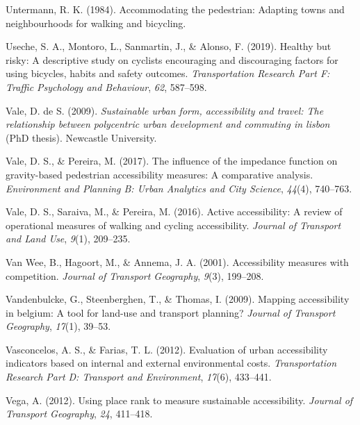 \documentclass[12pt,twoside]{reedthesis}
\newlength{\cslhangindent}
\newenvironment{CSLReferences}[2] %
 {%
  \setlength{\parindent}{0pt}
  \ifodd #1 \everypar{\setlength{\hangindent}{\cslhangindent}}\ignorespaces\fi
  \ifnum #2 > 0
  \setlength{\parskip}{#2\baselineskip}
  \fi
 }%
 {}
\begin{document}
\begin{CSLReferences}{1}{0}
\leavevmode{}%
Untermann, R. K. (1984). Accommodating the pedestrian: Adapting towns and neighbourhoods for walking and bicycling.

\leavevmode{}%
Useche, S. A., Montoro, L., Sanmartin, J., \& Alonso, F. (2019). Healthy but risky: A descriptive study on cyclists encouraging and discouraging factors for using bicycles, habits and safety outcomes. \emph{Transportation Research Part F: Traffic Psychology and Behaviour}, \emph{62}, 587--598.

\leavevmode{}%
Vale, D. de S. (2009). \emph{Sustainable urban form, accessibility and travel: The relationship between polycentric urban development and commuting in lisbon} (PhD thesis). Newcastle University.

\leavevmode{}%
Vale, D. S., \& Pereira, M. (2017). The influence of the impedance function on gravity-based pedestrian accessibility measures: A comparative analysis. \emph{Environment and Planning B: Urban Analytics and City Science}, \emph{44}(4), 740--763.

\leavevmode{}%
Vale, D. S., Saraiva, M., \& Pereira, M. (2016). Active accessibility: A review of operational measures of walking and cycling accessibility. \emph{Journal of Transport and Land Use}, \emph{9}(1), 209--235.

\leavevmode{}%
Van Wee, B., Hagoort, M., \& Annema, J. A. (2001). Accessibility measures with competition. \emph{Journal of Transport Geography}, \emph{9}(3), 199--208.

\leavevmode{}%
Vandenbulcke, G., Steenberghen, T., \& Thomas, I. (2009). Mapping accessibility in belgium: A tool for land-use and transport planning? \emph{Journal of Transport Geography}, \emph{17}(1), 39--53.

\leavevmode{}%
Vasconcelos, A. S., \& Farias, T. L. (2012). Evaluation of urban accessibility indicators based on internal and external environmental costs. \emph{Transportation Research Part D: Transport and Environment}, \emph{17}(6), 433--441.

\leavevmode{}%
Vega, A. (2012). Using place rank to measure sustainable accessibility. \emph{Journal of Transport Geography}, \emph{24}, 411--418.


\end{CSLReferences}
\end{document}
